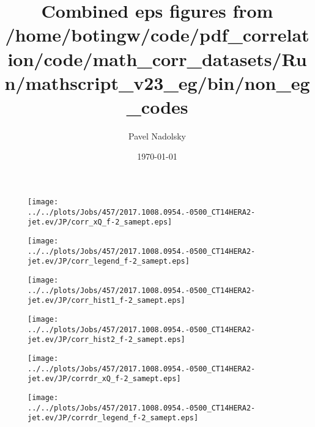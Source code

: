 \documentclass[12pt]{article}
\begin{document}
\title{Combined eps figures from /home/botingw/code/pdf\_correlation/code/math\_corr\_datasets/Run/mathscript\_v23\_eg/bin/non\_eg\_codes}
\date{\today}
\author{Pavel Nadolsky}
\maketitle
\begin{figure}
\texttt{[image: ../../plots/Jobs/457/2017.1008.0954.-0500\_CT14HERA2-jet.ev/JP/corr\_xQ\_f-2\_samept.eps]}
\caption{}
\end{figure}\newpage\clearpage
\begin{figure}
\texttt{[image: ../../plots/Jobs/457/2017.1008.0954.-0500\_CT14HERA2-jet.ev/JP/corr\_legend\_f-2\_samept.eps]}
\caption{}
\end{figure}\newpage\clearpage
\begin{figure}
\texttt{[image: ../../plots/Jobs/457/2017.1008.0954.-0500\_CT14HERA2-jet.ev/JP/corr\_hist1\_f-2\_samept.eps]}
\caption{}
\end{figure}\newpage\clearpage
\begin{figure}
\texttt{[image: ../../plots/Jobs/457/2017.1008.0954.-0500\_CT14HERA2-jet.ev/JP/corr\_hist2\_f-2\_samept.eps]}
\caption{}
\end{figure}\newpage\clearpage
\begin{figure}
\texttt{[image: ../../plots/Jobs/457/2017.1008.0954.-0500\_CT14HERA2-jet.ev/JP/corrdr\_xQ\_f-2\_samept.eps]}
\caption{}
\end{figure}\newpage\clearpage
\begin{figure}
\texttt{[image: ../../plots/Jobs/457/2017.1008.0954.-0500\_CT14HERA2-jet.ev/JP/corrdr\_legend\_f-2\_samept.eps]}
\caption{}
\end{figure}\newpage\clearpage
\end{document}
